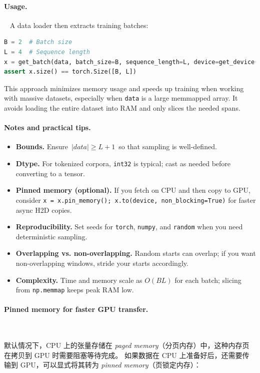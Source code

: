 \paragraph{Usage.}~{}
A data loader then extracts training batches:
\begin{lstlisting}[language=Python]
B = 2  # Batch size
L = 4  # Sequence length
x = get_batch(data, batch_size=B, sequence_length=L, device=get_device())
assert x.size() == torch.Size([B, L])
\end{lstlisting}

\noindent
This approach minimizes memory usage and speeds up training when working with massive datasets, 
especially when \texttt{data} is a large memmapped array. It avoids loading the entire dataset into RAM and only slices the needed spans.

\paragraph{Notes and practical tips.}
\begin{itemize}
  \item \textbf{Bounds.} Ensure \(\,|data| \ge L+1\,\) so that sampling is well-defined.
  \item \textbf{Dtype.} For tokenized corpora, \texttt{int32} is typical; cast as needed before converting to a tensor.
  \item \textbf{Pinned memory (optional).} If you fetch on CPU and then copy to GPU, consider 
        \texttt{x = x.pin\_memory(); x.to(device, non\_blocking=True)} for faster async H2D copies.
  \item \textbf{Reproducibility.} Set seeds for \texttt{torch}, \texttt{numpy}, and \texttt{random} when you need deterministic sampling.
  \item \textbf{Overlapping vs. non-overlapping.} Random starts can overlap; if you want non-overlapping windows, stride your starts accordingly.
  \item \textbf{Complexity.} Time and memory scale as \(O(BL)\) for each batch; slicing from \texttt{np.memmap} keeps peak RAM low.
\end{itemize}

\paragraph{Pinned memory for faster GPU transfer.}~{}

默认情况下，CPU 上的张量存储在 \emph{paged memory}（分页内存）中，这种内存页在拷贝到 GPU 时需要阻塞等待完成。  
如果数据在 CPU 上准备好后，还需要传输到 GPU，可以显式将其转为 \emph{pinned memory}（页锁定内存）：

